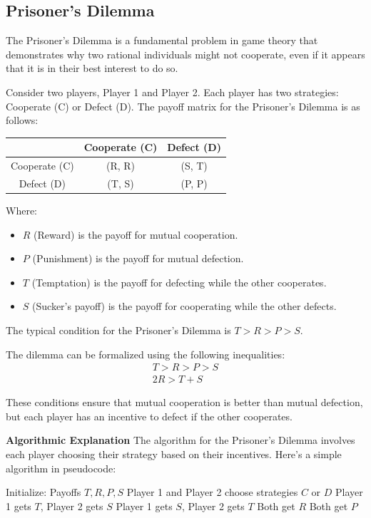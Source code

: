 \documentclass[12pt]{book} %
\begin{document}
\subsection{Prisoner's Dilemma}
The Prisoner's Dilemma is a fundamental problem in game theory that demonstrates why two rational individuals might not cooperate, even if it appears that it is in their best interest to do so.

Consider two players, Player 1 and Player 2. Each player has two strategies: Cooperate (C) or Defect (D). The payoff matrix for the Prisoner's Dilemma is as follows:

\begin{center}
\begin{tabular}{c|c|c}
 & Cooperate (C) & Defect (D) \\ \hline
Cooperate (C) & (R, R) & (S, T) \\ \hline
Defect (D) & (T, S) & (P, P) \\
\end{tabular}
\end{center}

Where:
\begin{itemize}
    \item $R$ (Reward) is the payoff for mutual cooperation.
    \item $P$ (Punishment) is the payoff for mutual defection.
    \item $T$ (Temptation) is the payoff for defecting while the other cooperates.
    \item $S$ (Sucker's payoff) is the payoff for cooperating while the other defects.
\end{itemize}

The typical condition for the Prisoner's Dilemma is $T > R > P > S$.

The dilemma can be formalized using the following inequalities:
\begin{align}
T > R > P > S \\
2R > T + S
\end{align}

These conditions ensure that mutual cooperation is better than mutual defection, but each player has an incentive to defect if the other cooperates.

\textbf{Algorithmic Explanation}
The algorithm for the Prisoner's Dilemma involves each player choosing their strategy based on their incentives. Here's a simple algorithm in pseudocode:
\FloatBarrier
\begin{algorithm}
\caption{Prisoner's Dilemma Strategy}
\begin{algorithmic}[1]
\State Initialize: Payoffs $T, R, P, S$
\State Player 1 and Player 2 choose strategies $C$ or $D$
    \State Player 1 gets $T$, Player 2 gets $S$
    \State Player 1 gets $S$, Player 2 gets $T$
    \State Both get $R$
\ElsIf
    \State Both get $P$
\EndIf
\end{algorithmic}
\end{algorithm}
\end{document}
